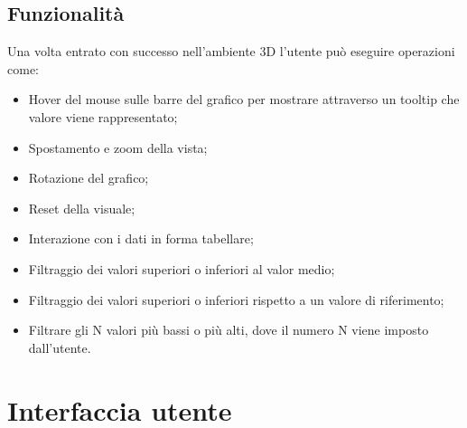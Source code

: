 \newpage


\subsection{Funzionalità}
Una volta entrato con successo nell'ambiente 3D l'utente può eseguire operazioni come:
\begin{itemize}
    \item Hover del mouse sulle barre del grafico per mostrare attraverso un tooltip che valore viene rappresentato;
    \item Spostamento e zoom della vista;
    \item Rotazione del grafico;
    \item Reset della visuale;
    \item Interazione con i dati in forma tabellare;
    \item Filtraggio dei valori superiori o inferiori al valor medio;
    \item Filtraggio dei valori superiori o inferiori rispetto a un valore di riferimento;
    \item Filtrare gli N valori più bassi o più alti, dove il numero N viene imposto dall'utente.
\end{itemize}

\section{Interfaccia utente}

